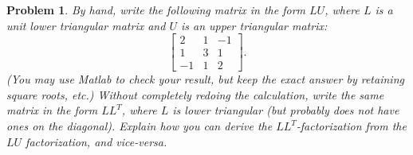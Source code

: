 \documentclass[12pt]{report}
\newtheorem{problem}{Problem}
\begin{document}
\newpage



\begin{problem}
By hand, write the following matrix in the form $LU$, where $L$ is a unit lower
triangular matrix and $U$ is an upper triangular matrix:
\[
\left[ \begin{array}{rrr} 2 & 1 & -1 \\ 1 & 3 & 1 \\ -1 & 1 & 2 \end{array}
\right] .
\]
(You may use Matlab to check your result, but keep the exact answer by retaining square roots, etc.)
Without completely redoing the calculation, write the same matrix in the form $L L^T$, 
where $L$ is lower triangular (but probably does {\em not} have ones on the diagonal).  
Explain how you can derive the $L L^T$-factorization from the $LU$ factorization, and vice-versa.
\end{problem}
\end{document}
